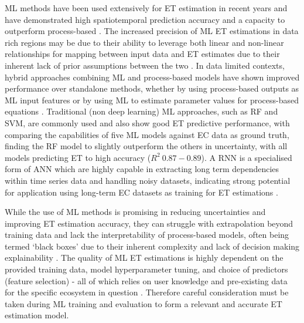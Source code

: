 \par ML methods have been used extensively for ET estimation in recent years and have demonstrated high spatiotemporal prediction accuracy and a capacity to outperform process-based \parencite{pan2020evaluation, yan2023deep}. The increased precision of ML ET estimations in data rich regions may be due to their ability to leverage both linear and non-linear relationships for mapping between input data and ET estimates due to their inherent lack of prior assumptions between the two \parencite{besnard2018,xue2025review}. In data limited contexts, hybrid approaches combining ML and process-based models have shown improved performance over standalone methods, whether by using process-based outputs as ML input features or by using ML to estimate parameter values for process-based equations \parencite{liu2021assessment,yan2023deep}. Traditional (non deep learning) ML approaches, such as \ac{RF} and \ac{SVM}, are commonly used and also show good ET predictive performance, with \textcite{xu2018evaluating} comparing the capabilities of five ML models against EC data as ground truth, finding the RF model to slightly outperform the others in uncertainty, with all models predicting ET to high accuracy ($R^2\:0.87-0.89$). A \ac{RNN} is a specialised form of \ac{ANN} which are highly capable in extracting long term dependencies within time series data and handling noisy datasets, indicating strong potential for application using long-term EC datasets as training for ET estimations \parencite{yan2023deep}. 
\par While the use of ML methods is promising in reducing uncertainties and improving ET estimation accuracy, they can struggle with extrapolation beyond training data and lack the interpretability of process-based models, often being termed `black boxes' due to their inherent complexity and lack of decision making explainability \parencite{hassija2024interpreting}. The quality of ML ET estimations is highly dependent on the provided training data, model hyperparameter tuning, and choice of predictors (feature selection) - all of which relies on user knowledge and pre-existing data for the specific ecosystem in question \parencite{amani2023review}. Therefore careful consideration must be taken during ML training and evaluation to form a relevant and accurate ET estimation model.

